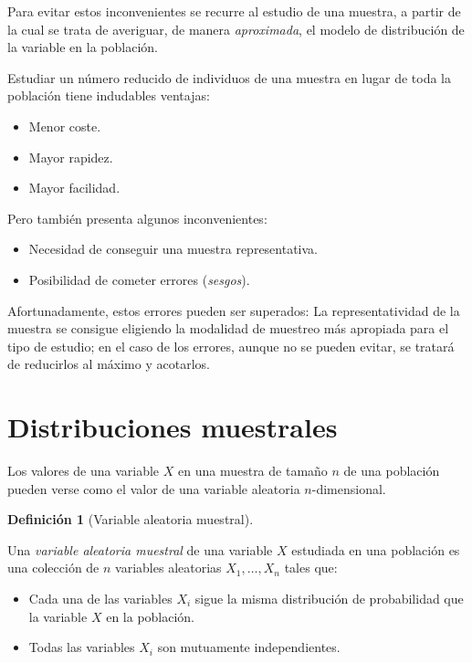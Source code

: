 \documentclass[
  a4paper,
]{scrreport}
\providecommand{\tightlist}{%
  \setlength{\itemsep}{0pt}\setlength{\parskip}{0pt}}\usepackage{longtable,booktabs,array}
\theoremstyle{plain}
\theoremstyle{definition}
\theoremstyle{definition}
\newtheorem{definition}{Definición}[chapter]
\theoremstyle{remark}
\begin{document}
Para evitar estos inconvenientes se recurre al estudio de una muestra, a
partir de la cual se trata de averiguar, de manera \emph{aproximada}, el
modelo de distribución de la variable en la población.

Estudiar un número reducido de individuos de una muestra en lugar de
toda la población tiene indudables ventajas:

\begin{itemize}
\tightlist
\item
  Menor coste.
\item
  Mayor rapidez.
\item
  Mayor facilidad.
\end{itemize}

Pero también presenta algunos inconvenientes:

\begin{itemize}
\tightlist
\item
  Necesidad de conseguir una muestra representativa.
\item
  Posibilidad de cometer errores (\emph{sesgos}).
\end{itemize}

Afortunadamente, estos errores pueden ser superados: La
representatividad de la muestra se consigue eligiendo la modalidad de
muestreo más apropiada para el tipo de estudio; en el caso de los
errores, aunque no se pueden evitar, se tratará de reducirlos al máximo
y acotarlos.

\hypertarget{distribuciones-muestrales}{%
\section{Distribuciones muestrales}\label{distribuciones-muestrales}}

Los valores de una variable \(X\) en una muestra de tamaño \(n\) de una
población pueden verse como el valor de una variable aleatoria
\(n\)-dimensional.

\begin{definition}[Variable aleatoria
muestral]\protect\hypertarget{def-variable-aleatoria-muestral}{}\label{def-variable-aleatoria-muestral}

Una \emph{variable aleatoria muestral} de una variable \(X\) estudiada
en una población es una colección de \(n\) variables aleatorias
\(X_1,\ldots,X_n\) tales que:

\begin{itemize}
\tightlist
\item
  Cada una de las variables \(X_i\) sigue la misma distribución de
  probabilidad que la variable \(X\) en la población.
\item
  Todas las variables \(X_i\) son mutuamente independientes.
\end{itemize}

\end{definition}
\end{document}
